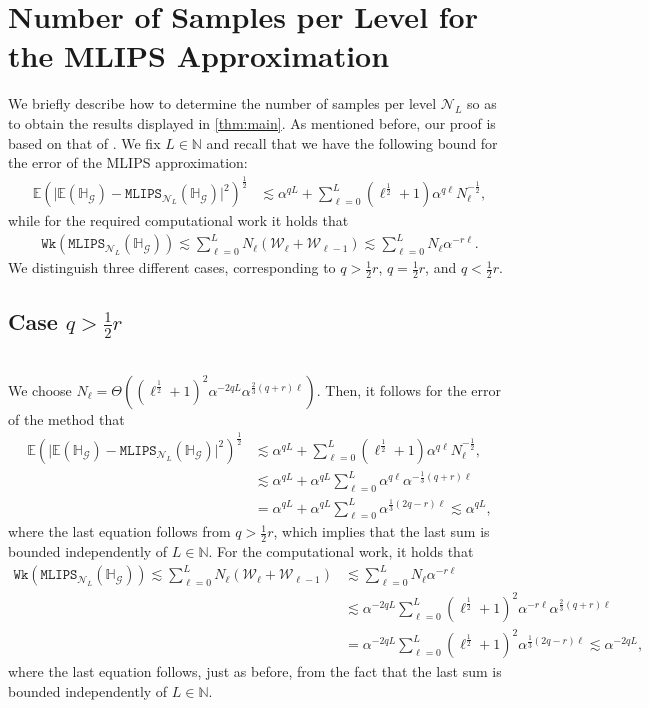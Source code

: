 \documentclass{article}
\newcommand{\cG}{\mathcal{G}}
\newcommand{\cN}{\mathcal{N}}
\newcommand{\cW}{\mathcal{W}}
\newcommand{\IE}{\mathbb{E}}
\newcommand{\IH}{\mathbb{H}}
\newcommand{\IN}{\mathbb{N}}
\newcommand{\mlmk}[2]{\mathtt{MLIPS}_{#1}{\left(#2\right)}}
\newcommand{\work}[1]{\mathtt{Wk}\!\left(#1\right)}
\theoremstyle{definition}
\begin{document}
\section{Number of Samples per Level for the MLIPS Approximation} 
\label{apdx:samp}
We briefly describe how to determine the number of samples per level $\cN_L$ so as to obtain
the results displayed in \cref{thm:main}. As mentioned before, our proof is based on that of
\cite[Thm.~1]{cliffeMultilevelMonteCarlo2011}. We fix $L\in\IN$ and recall that we have the
following bound for the error of the MLIPS approximation:
\begin{align*}
  \IE\left(\vert\IE(\IH_{\cG})-\mlmk{\cN_L}{\IH_{\cG}}\vert^2\right)^{\frac{1}{2}}
  &\lesssim\alpha^{qL}+
    \sum\limits_{\ell=0}^L(\ell^{\frac{1}{2}}+1)\alpha^{q\ell}N_{\ell}^{-\frac{1}{2}},
\end{align*}
while for the required computational work it holds that
\begin{align*}
  \work{\mlmk{\cN_L}{\IH_\cG}}\lesssim\sum\limits_{\ell=0}^{L}N_\ell(\cW_\ell+\cW_{\ell-1})\lesssim\sum\limits_{\ell=0}^{L}N_\ell\alpha^{-r\ell}.
\end{align*}
We distinguish three different cases, corresponding to $q>\frac{1}{2}r$, $q=\frac{1}{2}r$, and
$q<\frac{1}{2}r$.
\subsection{Case $q>\frac{1}{2}r$}~\\
We choose $N_\ell=\Theta((\ell^{\frac{1}{2}}+1)^2\alpha^{-2qL}\alpha^{\frac{2}{3}(q+r)\ell})$. Then, it follows for the error of the method that
\begin{align*}
  \IE\left(\vert\IE(\IH_{\cG})-\mlmk{\cN_L}{\IH_{\cG}}\vert^2\right)^{\frac{1}{2}}
  &\lesssim\alpha^{qL}+
    \sum\limits_{\ell=0}^L(\ell^{\frac{1}{2}}+1)\alpha^{q\ell}N_{\ell}^{-\frac{1}{2}},\\
  &\lesssim\alpha^{qL}+
    \alpha^{qL}\sum\limits_{\ell=0}^L\alpha^{q\ell}\alpha^{-\frac{1}{3}(q+r)\ell}\\
  &=\alpha^{qL}+
    \alpha^{qL}\sum\limits_{\ell=0}^L\alpha^{\frac{1}{3}(2q-r)\ell}
    \lesssim\alpha^{qL},
\end{align*}
where the last equation follows from $q>\frac{1}{2}r$, which implies that the last sum is bounded independently of $L\in\IN$.
For the computational work, it holds that
\begin{align*}
  \work{\mlmk{\cN_L}{\IH_\cG}}\lesssim\sum\limits_{\ell=0}^{L}N_\ell(\cW_\ell+\cW_{\ell-1})
  &\lesssim\sum\limits_{\ell=0}^{L}N_\ell\alpha^{-r\ell}\\
  &\lesssim\alpha^{-2qL}\sum\limits_{\ell=0}^{L}(\ell^{\frac{1}{2}}+1)^2\alpha^{-r\ell}\alpha^{\frac{2}{3}(q+r)\ell}\\
  &=\alpha^{-2qL}\sum\limits_{\ell=0}^{L}(\ell^{\frac{1}{2}}+1)^2\alpha^{\frac{1}{3}(2q-r)\ell}
    \lesssim\alpha^{-2qL},
\end{align*}
where the last equation follows, just as before, from the fact that the last sum is bounded independently of $L\in\IN$.
\end{document}
